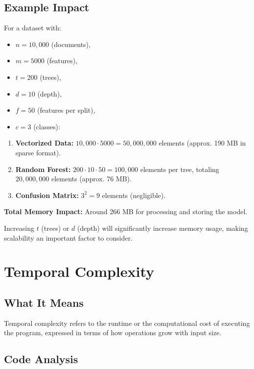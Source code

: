 \documentclass[runningheads,a4paper,11pt]{report}
\begin{document}
\subsection{Example Impact}
\label{section:example-spatial}
For a dataset with:
\begin{itemize}
  \item $n = 10,000$ (documents),
  \item $m = 5000$ (features),
  \item $t = 200$ (trees),
  \item $d = 10$ (depth),
  \item $f = 50$ (features per split),
  \item $c = 3$ (classes):
\end{itemize}

\begin{enumerate}
  \item \textbf{Vectorized Data:} $10,000 \cdot 5000 = 50,000,000$ elements (approx. 190 MB in sparse format).
  \item \textbf{Random Forest:} $200 \cdot 10 \cdot 50 = 100,000$ elements per tree, totaling $20,000,000$ elements (approx. 76 MB).
  \item \textbf{Confusion Matrix:} $3^2 = 9$ elements (negligible).
\end{enumerate}

\textbf{Total Memory Impact:} Around 266 MB for processing and storing the model.

Increasing $t$ (trees) or $d$ (depth) will significantly increase memory usage, making scalability an important factor to consider.

\section{Temporal Complexity}

\subsection{What It Means}
\label{section:it-means}
Temporal complexity refers to the runtime or the computational cost of executing the program, expressed in terms of how operations grow with input size.

\subsection{Code Analysis}
\label{section:codeAnalysis}
\end{document}
